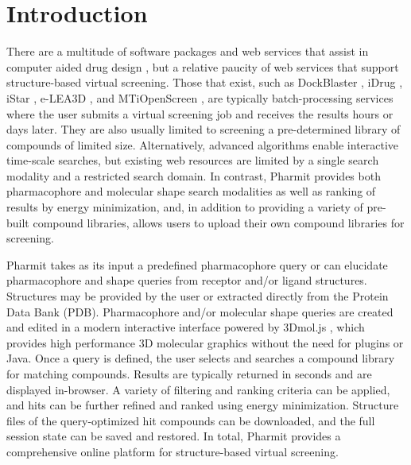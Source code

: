 \section{Introduction}

There are a multitude of software packages and web services that assist in computer aided drug design \cite{Villoutreix_2013}, but a relative paucity of web services that support structure-based virtual screening.  Those that exist, such as DockBlaster \cite{Irwin_2009}, iDrug \cite{Wang_2014}, iStar \cite{Li_2014}, e-LEA3D \cite{Douguet_2010}, and MTiOpenScreen \cite{Labb__2015}, are typically batch-processing services where the user submits a virtual screening job and receives the results hours or days later. They are also usually limited to screening a pre-determined library of compounds of limited size. Alternatively, advanced algorithms enable interactive time-scale searches, but existing web resources \cite{Koes_2012,Koes_2012z} are limited by a single search modality and a restricted search domain.  In contrast, Pharmit provides both pharmacophore and molecular shape search modalities as well as ranking of results by energy minimization, and, in addition to providing a variety of pre-built compound libraries, allows users to upload their own compound libraries for screening. 

Pharmit takes as its input a predefined pharmacophore query or can elucidate pharmacophore and shape queries from receptor and/or ligand structures. Structures may be provided by the user or extracted directly from the Protein Data Bank (PDB). 
Pharmacophore and/or molecular shape queries are created and edited in a modern interactive interface powered by 3Dmol.js \cite{Rego_2014}, which provides high performance 3D molecular graphics without the need for plugins or Java. Once a query is defined, the user selects and searches a compound library for matching compounds.  Results are typically returned in seconds and are displayed in-browser.  A variety of filtering and ranking criteria can be applied, and hits can be further refined and ranked using energy minimization. Structure files of the query-optimized hit compounds can be downloaded, and the full session state can be saved and restored.  In total, Pharmit provides a comprehensive online platform for structure-based virtual screening.





